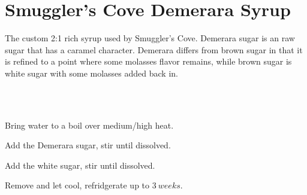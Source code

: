 \section[SC Demerara Syrup]{Smuggler's Cove Demerara Syrup}


\begin{recipestats}[
	servings=$\approx~1\onehalf~Cup$,
	preptime=5~\minute,
	original=\citefield{smugglersCove}{shorttitle} \cite{smugglersCove},
]
\end{recipestats}

\begin{recipeabstract}
	The custom 2:1 rich syrup used by Smuggler's Cove.
	Demerara sugar is an raw sugar that has a caramel character.
	Demerara differs from brown sugar in that it is refined to a point where some molasses flavor remains,
		while brown sugar is white sugar with some molasses added back in.
\end{recipeabstract}


\begin{ingredientcolumns}[1]
	\begin{ingredientblock}
		\\
		\\
	\end{ingredientblock}
\end{ingredientcolumns}


\begin{preparation}
\item Bring water to a boil over medium/high heat.
\item Add the Demerara sugar, stir until dissolved.
\item Add the white sugar, stir until dissolved.
\item Remove and let cool, refridgerate up to $3~weeks$.
\end{preparation}


\recipeend
